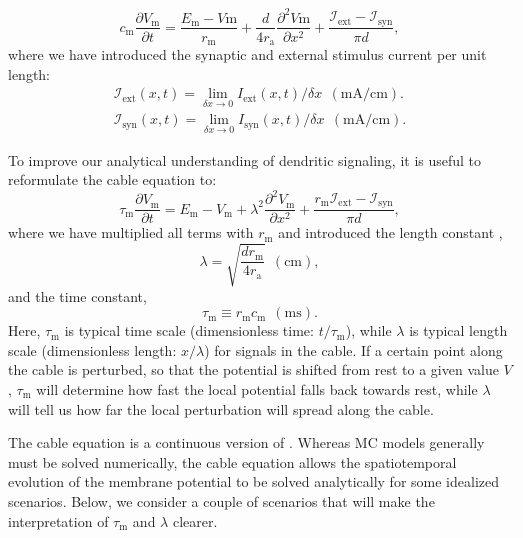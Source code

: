 \begin{equation}
c_\text{m} \frac{\partial V_\mathrm{m}}{\partial t} = \frac{E_\text{m}-V\mathrm{m}}{r_\text{m}} +  \frac{d}{4 r_\text{a}}  \frac{\partial^2 V\mathrm{m}}{\partial x^2} +  \frac{\mathcal{I}_{\mathrm{ext}}-\mathcal{I}_{\mathrm{syn}}}{\pi d},
\label{eq:Neuron:cable}
\end{equation}
where we have introduced the synaptic and external stimulus current per unit length:
\begin{eqnarray}
\mathcal{I}_{\mathrm{ext}}(x,t) = \lim_{\delta x \to 0} I_{\mathrm{ext}}(x,t)/\delta x \,\; (\si{\milli\ampere\per\centi\metre}). 
\nonumber \\
\mathcal{I}_{\mathrm{syn}}(x,t) = \lim_{\delta x \to 0} I_{\mathrm{syn}}(x,t)/\delta x \,\; (\si{\milli\ampere\per\centi\metre}). 
\label{eq:Neuron:CurrentPerUnitLength}
\end{eqnarray}

To improve our analytical understanding of dendritic signaling, it is useful to reformulate the cable equation to:
\begin{equation}
\tau_\text{m} \frac{\partial V_\mathrm{m}}{\partial t} = E_\mathrm{m}-V_\mathrm{m} +   \lambda^2  \frac{\partial^2 V_\mathrm{m}}{\partial x^2}  + \frac{r_\mathrm{m} \mathcal{I}_{\mathrm{ext}} - \mathcal{I}_{\mathrm{syn}} }{\pi d},
\label{eq:Neuron:cable2}
\end{equation}
where we have multiplied all terms with $r_\text{m}$ and introduced the length constant ,
\begin{equation}
\lambda = \sqrt{\frac{d r_\text{m}}{4 r_\text{a}}} \,\; (\si{\centi\metre}), 
\label{eq:Neuron:lengthconst}
\end{equation}
and the time constant, 
\begin{equation}
\tau_\text{m} \equiv r_\text{m} c_\text{m}  \,\; (\si{\milli\second}).
\label{eq:Neuron:timeconst}
\end{equation}
Here, $\tau_\mathrm{m}$ is typical time scale (dimensionless time: $t/\tau_\mathrm{m}$), while $\lambda$  is typical length scale  (dimensionless length: $x/\lambda$) for signals in the cable. If a certain point along the cable is perturbed, so that the potential is shifted from rest to a given value $V$, $\tau_\text{m}$ will determine how fast the local potential falls back towards rest, while $\lambda$ will tell us how far the local perturbation will spread along the cable. 

The cable equation is a continuous version of . Whereas MC models generally must be solved numerically, the cable equation allows the spatiotemporal evolution of the membrane potential to be solved analytically for some idealized scenarios. Below, we consider a couple of scenarios that will  make the interpretation of $\tau_\text{m}$ and $\lambda$ clearer. 


